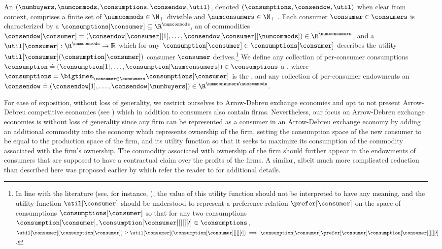 An  $(\numbuyers, \numcommods, \consumptions, \consendow, \util)$, denoted $(\consumptions, \consendow, \util)$ when clear from context, comprises a finite set of $\numcommods \in \N_+$ divisible  and $\numconsumers \in \N_+$ .
Each consumer $\consumer \in \consumers$ is characterized by a  $\consumptions[\consumer] \subseteq \R^{\numcommods}$, an  of commodities $\consendow[\consumer] = \left(\consendow[\consumer][1], \dots, \consendow[\consumer][\numcommods] \right) \in \R^\numconsumers$, and a  $\util[\consumer]: \R^{\numcommods} \to \mathbb{R}$ which for any  $\consumption[\consumer] \in \consumptions[\consumer]$ describes the utility $\util[\consumer](\consumption[\consumer])$ consumer $\consumer$ derives.\footnote{In line with the literature (see, for instance, \cite{debreu1954representation}), the  value of this utility function should not be interpreted to have any meaning, and the utility function $\util[\consumer]$ should be understood to represent a preference relation $\prefer[\consumer]$ on the space of consumptions $\consumptions[\consumer]$ so that for any two consumptions $\consumption[\consumer], \consumption[\consumer][][][\prime] \in \consumptions$, $\util[\consumer](\consumption[\consumer]) \geq \util[\consumer](\consumption[\consumer][][][\prime]) \implies \consumption[\consumer] \prefer[\consumer] \consumption[\consumer][][][\prime]$. }
We define any collection of per-consumer consumptions $\consumption \doteq (\consumption[1], \hdots, \consumption[\numconsumers]) \in \consumptions$ a , where $\consumptions \doteq \bigtimes_{\consumer \in \consumers} \consumptions[\consumer]$ is the , and any collection of per-consumer endowments an  $\consendow \doteq \left(\consendow[1], \hdots, \consendow[\numbuyers] \right) \in \R^{\numconsumers \numcommods}$. 

\begin{remark}
    For ease of exposition, without loss of generality, we restrict ourselves to Arrow-Debreu exchange economies and opt to not present Arrow-Debreu competitive economies (see \citet{arrow-debreu}) which in addition to consumers also contain firms. Nevertheless, our focus on Arrow-Debreu exchange economies is without loss of generality since any firm can be represented as a consumer in an Arrow-Debreu exchange economy by adding an additional commodity into the economy which represents ownership of the firm, setting the consumption space of the new consumer to be equal to the production space of the firm, and its utility function so that it seeks to maximize its consumption of the commodity associated with the firm's ownership. The commodity associated with ownership of the firm should further appear in the endowments of consumers that are supposed to have a contractual claim over the profits of the firms. A similar, albeit much more complicated reduction than described here was proposed earlier by \citet{garg2015markets} which refer the reader to for additional details.
\end{remark}


